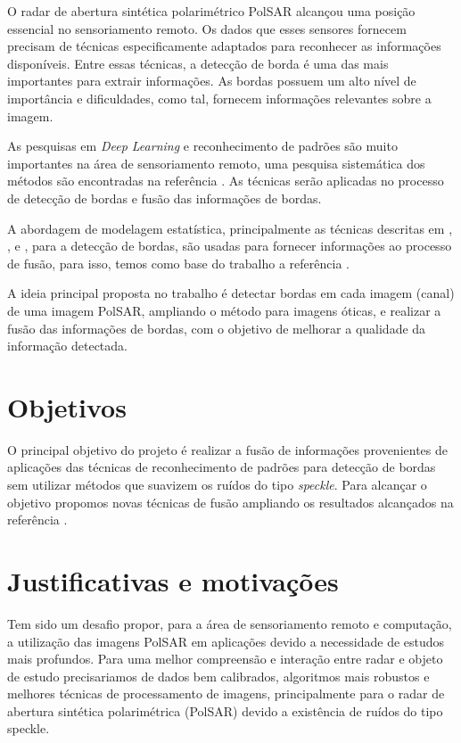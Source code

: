 \documentclass[runningheads]{llncs}
\begin{document}
O radar de abertura sintética polarimétrico PolSAR alcançou uma posição essencial no sensoriamento remoto. Os dados que esses sensores fornecem precisam de técnicas especificamente adaptados para reconhecer as informações disponíveis. Entre essas técnicas, a detecção de borda é uma das mais importantes para extrair informações. As bordas possuem um alto nível de importância e dificuldades, como tal, fornecem informações relevantes sobre a imagem.

As pesquisas em \textit{Deep Learning} e reconhecimento de padrões são muito importantes na área de sensoriamento remoto, uma pesquisa sistemática dos métodos são encontradas na referência \cite{ztmxzxf}. 
As técnicas serão aplicadas no processo de detecção de bordas e fusão das informações de bordas. 

A abordagem de modelagem estatística, principalmente as técnicas descritas em \cite{bmf_2020}, \cite{nhfc},  e \cite{ref_proc3}, para a detecção de bordas, são usadas para fornecer informações ao processo de fusão, para isso, temos como base do trabalho a referência \cite{ref_proc4}. 

A ideia principal proposta no trabalho é detectar bordas em cada imagem (canal) de uma imagem PolSAR, ampliando o método para imagens óticas, e realizar a fusão das informações de bordas, com o objetivo de melhorar a qualidade da informação detectada.

\section{Objetivos}

O principal objetivo do projeto é realizar a fusão de informações provenientes de aplicações das técnicas de reconhecimento de padrões para detecção de bordas sem utilizar métodos que suavizem os ruídos do tipo \textit{speckle}. Para alcançar o objetivo propomos novas técnicas de fusão ampliando os resultados alcançados na referência \cite{bmf_2020}.

\section{Justificativas e motivações}

Tem sido um desafio propor, para a área de sensoriamento remoto e computação, a utilização das imagens PolSAR em aplicações devido a necessidade de estudos mais profundos. Para uma melhor compreensão e interação entre radar e objeto de estudo precisariamos de dados bem calibrados, algoritmos mais robustos e melhores técnicas de processamento de imagens, principalmente para o radar de abertura sintética polarimétrica (PolSAR) devido a existência de ruídos do tipo speckle.
\end{document}
